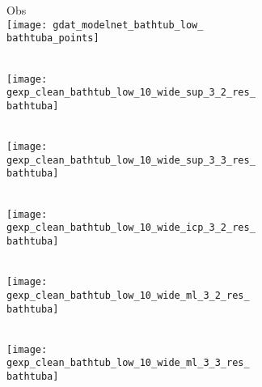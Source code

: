 \begin{figure*}[t]
{\begin{subfigure}[t]{1\textwidth}
   		\begin{subfigure}[t]{0.095\textwidth}
   			\vspace{0px}\centering
   			Obs\\
   			\texttt{[image: gdat\_modelnet\_bathtub\_low\_\\bathtuba\_points]}
   		\end{subfigure}
   		\begin{subfigure}[t]{0.095\textwidth}
   			\vspace{0px}\centering
   			\Dai\\
   			\texttt{[image: gexp\_clean\_bathtub\_low\_10\_wide\_sup\_3\_2\_res\_\\bathtuba]}
   		\end{subfigure}
   		\begin{subfigure}[t]{0.095\textwidth}
   			\vspace{0px}\centering
   			\Dai\\
   			\texttt{[image: gexp\_clean\_bathtub\_low\_10\_wide\_sup\_3\_3\_res\_\\bathtuba]}
   		\end{subfigure}
   		\begin{subfigure}[t]{0.095\textwidth}
   			\vspace{0px}\centering
   			\ICP\\
   			\texttt{[image: gexp\_clean\_bathtub\_low\_10\_wide\_icp\_3\_2\_res\_\\bathtuba]}
   		\end{subfigure}
        \begin{subfigure}[t]{0.095\textwidth}
            \vspace{0px}\centering
            \ML\\
            \texttt{[image: gexp\_clean\_bathtub\_low\_10\_wide\_ml\_3\_2\_res\_\\bathtuba]}
        \end{subfigure}
   		\begin{subfigure}[t]{0.095\textwidth}
   			\vspace{0px}\centering
   			\ML\\
   			\texttt{[image: gexp\_clean\_bathtub\_low\_10\_wide\_ml\_3\_3\_res\_\\bathtuba]}
   		\end{subfigure}
   		\begin{subfigure}[t]{0.095\textwidth}

\end{subfigure}
\end{subfigure}}
\end{figure*}
